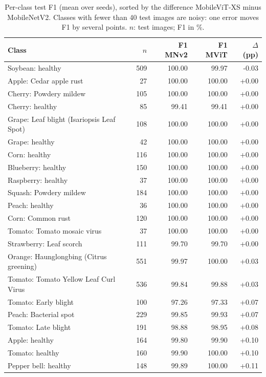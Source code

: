 \begin{table}[!t]
\centering
\scriptsize
\setlength{\tabcolsep}{3pt}
\caption{Per-class test F1 (mean over seeds), sorted by the difference MobileViT-XS minus MobileNetV2. Classes with fewer than 40 test images are noisy: one error moves F1 by several points. $n$: test images; F1 in \%.}
\label{tab:perclass}
\begin{tabular}{P{0.44\columnwidth}rrrr}
\toprule
Class & $n$ & F1 MNv2 & F1 MViT & $\Delta$ (pp) \\
\midrule
Soybean: healthy & 509 & 100.00 & 99.97 & -0.03 \\
Apple: Cedar apple rust & 27 & 100.00 & 100.00 & +0.00 \\
Cherry: Powdery mildew & 105 & 100.00 & 100.00 & +0.00 \\
Cherry: healthy & 85 & 99.41 & 99.41 & +0.00 \\
Grape: Leaf blight (Isariopsis Leaf Spot) & 108 & 100.00 & 100.00 & +0.00 \\
Grape: healthy & 42 & 100.00 & 100.00 & +0.00 \\
Corn: healthy & 116 & 100.00 & 100.00 & +0.00 \\
Blueberry: healthy & 150 & 100.00 & 100.00 & +0.00 \\
Raspberry: healthy & 37 & 100.00 & 100.00 & +0.00 \\
Squash: Powdery mildew & 184 & 100.00 & 100.00 & +0.00 \\
Peach: healthy & 36 & 100.00 & 100.00 & +0.00 \\
Corn: Common rust & 120 & 100.00 & 100.00 & +0.00 \\
Tomato: Tomato mosaic virus & 37 & 100.00 & 100.00 & +0.00 \\
Strawberry: Leaf scorch & 111 & 99.70 & 99.70 & +0.00 \\
Orange: Haunglongbing (Citrus greening) & 551 & 99.97 & 100.00 & +0.03 \\
Tomato: Tomato Yellow Leaf Curl Virus & 536 & 99.84 & 99.88 & +0.03 \\
Tomato: Early blight & 100 & 97.26 & 97.33 & +0.07 \\
Peach: Bacterial spot & 229 & 99.85 & 99.93 & +0.07 \\
Tomato: Late blight & 191 & 98.88 & 98.95 & +0.08 \\
Apple: healthy & 164 & 99.80 & 99.90 & +0.10 \\
Tomato: healthy & 160 & 99.90 & 100.00 & +0.10 \\
Pepper bell: healthy & 148 & 99.89 & 100.00 & +0.11 \\

\end{tabular}
\end{table}
